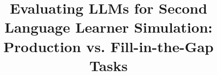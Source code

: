 \title{Evaluating LLMs for Second Language Learner Simulation: Production vs. Fill-in-the-Gap Tasks}
